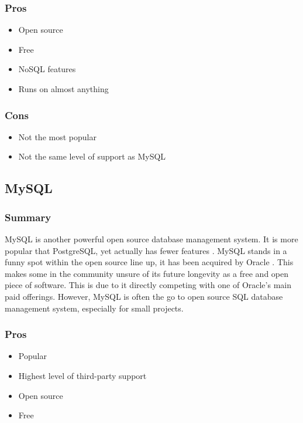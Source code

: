         \subsubsection{Pros}
        \begin{itemize}
            \item Open source
            \item Free
            \item NoSQL features
            \item Runs on almost anything \cite{db_comparison}
        \end{itemize}
        
        \subsubsection{Cons}
        \begin{itemize}
            \item Not the most popular
            \item Not the same level of support as MySQL
        \end{itemize}
    
    \subsection{MySQL}
    
        \subsubsection{Summary}
        
        MySQL is another powerful open source database management system.  It is more popular that PostgreSQL, yet actually has fewer features \cite{db_comparison}.  MySQL stands in a funny spot within the open source line up, it has been acquired by Oracle \cite{mysql}.  This makes some in the community unsure of its future longevity as a free and open piece of software.  This is due to it directly competing with one of Oracle's main paid offerings.  However, MySQL is often the go to open source SQL database management system, especially for small projects.
        
        \subsubsection{Pros}
        \begin{itemize}
            \item Popular
            \item Highest level of third-party support
            \item Open source
            \item Free
        \end{itemize}
        
